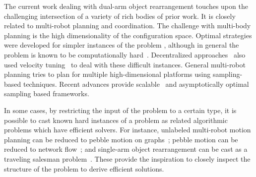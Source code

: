 %
The current work dealing with dual-arm object rearrangement touches upon the challenging intersection of a variety of rich bodies of prior work. It is closely related to multi-robot planning and coordination. The challenge with multi-body planning is the high dimensionality of the configuration space. %
Optimal strategies were developed for simpler instances of the problem \cite{solovey2015motion}, although in general the problem is known to be computationally hard~\cite{solovey2016hardness}. Decentralized approaches~\cite{van2005prioritized} also used velocity tuning~\cite{leroy1999multiple} to deal with these difficult instances. General multi-robot planning tries to plan for multiple high-dimensional platforms \cite{wagner2012probabilistic,Gharbi:2009fu} using sampling-based techniques. 
Recent advances provide scalable~\cite{SoloveySH16:ijrr} and asymptotically optimal~\cite{Dobson:2017aa} sampling based frameworks. 


In some cases, by restricting the input of the problem to a certain type, it is possible to cast known hard instances of a problem as related algorithmic problems which have efficient solvers. For instance, unlabeled multi-robot motion planning can be reduced to pebble motion on graphs~\cite{abhs-unlabeled14}; pebble motion can be reduced to network flow~\cite{yu2016optimal}; and single-arm object rearrangement can be cast as a traveling salesman problem~\cite{193}. These provide the inspiration to closely inspect the structure of the problem to derive efficient solutions.


